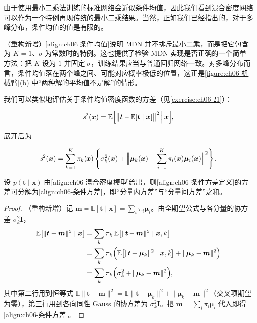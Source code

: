 \documentclass[../../main.tex]{subfiles}
\begin{document}
由于使用最小二乘法训练的标准网络会近似条件均值，因此我们看到混合密度网络可以作为一个特例再现传统的最小二乘结果。当然，正如我们已经指出的，对于多峰分布，条件均值的值是有限的。

\begin{remark}（重构新增）\eqref{align:ch06-条件均值}说明 MDN 并不排斥最小二乘，而是把它包含为 $K=1$、$\sigma$ 为常数时的特例。这也提供了检验 MDN 实现是否正确的一个简单方法：把 $K$ 设为 $1$ 并固定 $\sigma$，训练结果应当与普通回归网络一致。对多峰分布而言，条件均值落在两个峰之间、可能对应概率极低的位置，这正是\cref{figure:ch06-机械臂}(b) 中“两种解的平均值不是解”的情形。
\end{remark}

我们可以类似地评估关于条件均值密度函数的方差（见\cref{exercise:ch06-21}）：

\begin{align}
s^{2}(\boldsymbol{x})=\mathbb{E}\Bigl[\bigl\|\boldsymbol{t}-\mathbb{E}[\boldsymbol{t}\mid\boldsymbol{x}]\bigr\|^{2}\,\Big|\,\boldsymbol{x}\Bigr],
\label{align:ch06-条件方差定义}
\end{align}

展开后为

\begin{align}
s^{2}(\boldsymbol{x})=\sum_{k=1}^{K}\pi_k(\boldsymbol{x})\left\{\sigma_k^{2}(\boldsymbol{x})+\Bigl\|\boldsymbol{\mu}_k(\boldsymbol{x})-\sum_{i=1}^{K}\pi_i(\boldsymbol{x})\boldsymbol{\mu}_i(\boldsymbol{x})\Bigr\|^{2}\right\}.
\label{align:ch06-条件方差}
\end{align}

\begin{proposition}[条件方差分解]\label{proposition:ch06-条件方差}
设 $p(\boldsymbol{t}\mid\boldsymbol{x})$ 由\eqref{align:ch06-混合密度模型}给出，则\eqref{align:ch06-条件方差定义}的方差可分解为\eqref{align:ch06-条件方差}，即“分量内方差”与“分量间方差”之和。
\end{proposition}

\begin{proof}
（重构新增）记 $\boldsymbol{m}=\mathbb{E}[\boldsymbol{t}\mid\boldsymbol{x}]=\sum_i\pi_i\boldsymbol{\mu}_i$。由全期望公式与各分量的协方差 $\sigma_k^{2}\boldsymbol{I}$，
\begin{align}
\mathbb{E}\bigl[\|\boldsymbol{t}-\boldsymbol{m}\|^{2}\mid\boldsymbol{x}\bigr]
&=\sum_{k}\pi_k\,\mathbb{E}\bigl[\|\boldsymbol{t}-\boldsymbol{m}\|^{2}\mid\boldsymbol{x},k\bigr]\nonumber\\
&=\sum_{k}\pi_k\Bigl(\mathbb{E}\bigl[\|\boldsymbol{t}-\boldsymbol{\mu}_k\|^{2}\mid\boldsymbol{x},k\bigr]+\|\boldsymbol{\mu}_k-\boldsymbol{m}\|^{2}\Bigr)\nonumber\\
&=\sum_{k}\pi_k\Bigl(\sigma_k^{2}+\|\boldsymbol{\mu}_k-\boldsymbol{m}\|^{2}\Bigr),
\end{align}
其中第二行用到恒等式 $\mathbb{E}\|\boldsymbol{t}-\boldsymbol{m}\|^{2}=\mathbb{E}\|\boldsymbol{t}-\boldsymbol{\mu}_k\|^{2}+\|\boldsymbol{\mu}_k-\boldsymbol{m}\|^{2}$（交叉项期望为零），第三行用到各向同性 Gauss 的协方差为 $\sigma_k^{2}\boldsymbol{I}$。把 $\boldsymbol{m}=\sum_i\pi_i\boldsymbol{\mu}_i$ 代入即得\eqref{align:ch06-条件方差}。
\end{proof}
\end{document}
